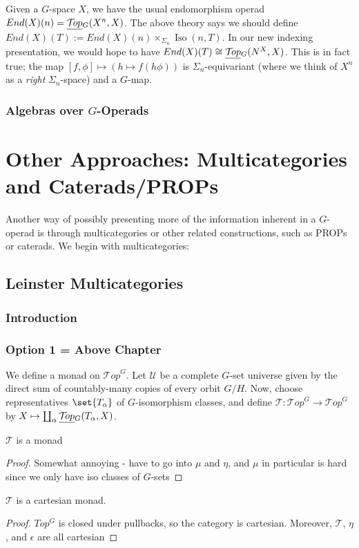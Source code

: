 \documentclass{report}
\newcommand{\Top}{\text{$\mathcal{T}\!op$}}
\DeclareMathOperator{\Iso}{Iso}
\newcommand{\TopG}{\text{\underline{$\Top$}$_G$}}
\begin{document}
\begin{example}
  Given a $G$-space $X$, we have the usual endomorphism operad $End(X)(n) = \TopG(X^n,X)$. The above theory says we should define $End(X)(T) := End(X)(n)\times_{\Sigma_n}\Iso(n,T)$. In our new indexing presentation, we would hope to have $End(X)(T) \cong \TopG(N^X, X)$. This is in fact true; the map $[f,\phi]\mapsto(h\mapsto f(h\phi))$ is $\Sigma_n$-equivariant (where we think of $X^n$ as a {\em right} $\Sigma_n$-space) and a $G$-map. 
\end{example}



\subsection{Algebras over $G$-Operads}




\chapter{Other Approaches: Multicategories and Caterads/PROPs}
Another way of possibly presenting more of the information inherent in a $G$-operad is through multicategories or other related constructions, such as PROPs or caterads. We begin with multicategories:

\section{Leinster Multicategories}
\subsection{Introduction}
\newcommand{\T}{\text{$\mathcal{T}$}}

\subsection{Option 1 = Above Chapter}
We define a monad on $\Top^G$. Let $\mathcal{U}$ be a complete $G$-set universe given by the direct sum of countably-many copies of every orbit $G/H$. Now, choose representatives $\set{T_\alpha}$ of $G$-isomorphism classes, and define $\T: \Top^G\to \Top^G$ by $X\mapsto \coprod_\alpha\TopG(T_\alpha, X)$. 
\begin{lemma}
  $\T$ is a monad
\end{lemma}
\begin{proof}
  Somewhat annoying  - have to go into $\mu$ and $\eta$, and $\mu$ in particular is hard since we only have iso classes of $G$-sets
\end{proof}
\begin{lemma}
  $\T$ is a cartesian monad.
\end{lemma}
\begin{proof}
  $Top^G$ is closed under pullbacks, so the category is cartesian. Moreover, $\T$, $\eta$, and $\epsilon$ are all cartesian
\end{proof}
\end{document}
